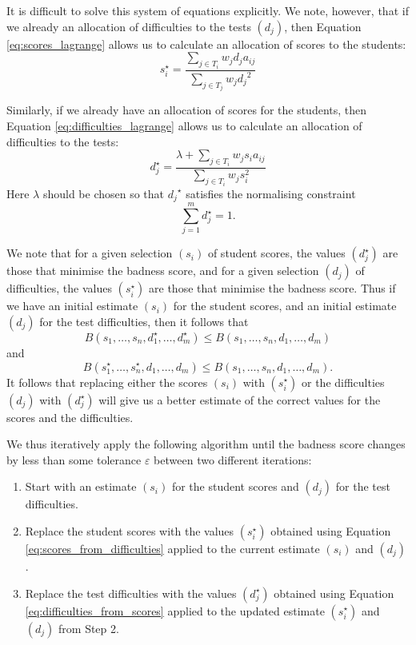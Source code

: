 \documentclass{article}
\begin{document}
It is difficult to solve this system of equations explicitly. We note, however, that if we already an allocation of difficulties to the tests $(d_j)$, then Equation \ref{eq:scores_lagrange} allows us to calculate an allocation of scores to the students:
\begin{equation}\label{eq:scores_from_difficulties}
    s_i^\star = \frac{\sum_{j \in T_i} w_j d_j a_{ij}}{\sum_{j \in T_j} w_j {d_j}^2}
\end{equation}

Similarly, if we already have an allocation of scores for the students, then Equation \ref{eq:difficulties_lagrange} allows us to calculate an allocation of difficulties to the tests:
\begin{equation}\label{eq:difficulties_from_scores}
    d_j^\star = \frac{\lambda + \sum_{j \in T_i} w_j s_i a_{ij}}{\sum_{j \in T_i} w_j s_i^2}
\end{equation}
Here $\lambda$ should be chosen so that ${d_j}^\star$ satisfies the normalising constraint
\[
  \sum_{j=1}^{m} d_j^\star = 1.  
\]

We note that for a given selection $(s_i)$ of student scores, the values $(d_j^\star)$ are those that minimise the badness score, and for a given selection $(d_j)$ of difficulties, the values $(s_i^\star)$ are those that minimise the badness score. Thus if we have an initial estimate $(s_i)$ for the student scores, and an initial estimate $(d_j)$ for the test difficulties, then it follows that
\[
    B(s_1, \dots, s_n, d_1^\star, \dots, d_m^\star) \leq B(s_1, \dots, s_n, d_1, \dots, d_m)
\]
and
\[
    B(s_1^\star, \dots, s_n^\star, d_1, \dots, d_m) \leq B(s_1, \dots, s_n, d_1, \dots, d_m).
\]
It follows that replacing either the scores $(s_i)$ with $(s_i^\star)$ or the difficulties $(d_j)$ with $(d_j^\star)$ will give us a better estimate of the correct values for the scores and the difficulties.

We thus iteratively apply the following algorithm until the badness score changes by less than some tolerance $\varepsilon$ between two different iterations:
\begin{enumerate}
    \item Start with an estimate $(s_i)$ for the student scores and $(d_j)$ for the test difficulties.
    \item Replace the student scores with the values $(s_i^\star)$ obtained using Equation \ref{eq:scores_from_difficulties} applied to the current estimate $(s_i)$ and $(d_j)$.
    \item Replace the test difficulties with the values $(d_j^\star)$ obtained using Equation \ref{eq:difficulties_from_scores} applied to the updated estimate $(s_i^\star)$ and $(d_j)$ from Step 2.
\end{enumerate}
    
\end{document}
